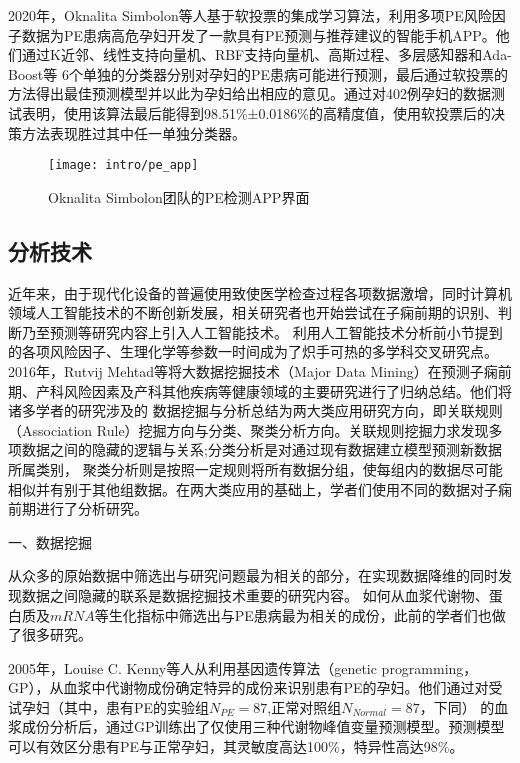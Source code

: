 2020年，Oknalita Simbolon等人基于软投票的集成学习算法，利用多项PE风险因子数据为PE患病高危孕妇开发了一款具有PE预测与推荐建议的智能手机APP\cite{Simbolon2020}。他们通过K近邻、线性支持向量机、RBF支持向量机、高斯过程、多层感知器和Ada-Boost等
6个单独的分类器分别对孕妇的PE患病可能进行预测，最后通过软投票的方法得出最佳预测模型并以此为孕妇给出相应的意见。通过对402例孕妇的数据测试表明，使用该算法最后能得到98.51\%±0.0186\%的高精度值，使用软投票后的决策方法表现胜过其中任一单独分类器。
\begin{figure}[htbp]
    \centering
    \texttt{[image: intro/pe\_app]}
    \caption[Oknalita Simbolon团队的PE检测APP界面]{\label{fig:pe_app}Oknalita Simbolon团队的PE检测APP界面\cite{Simbolon2020}}
\end{figure}

\subsection{分析技术}
近年来，由于现代化设备的普遍使用致使医学检查过程各项数据激增，同时计算机领域人工智能技术的不断创新发展，相关研究者也开始尝试在子痫前期的识别、判断乃至预测等研究内容上引入人工智能技术。
利用人工智能技术分析前小节提到的各项风险因子、生理化学等参数一时间成为了炽手可热的多学科交叉研究点。
2016年，Rutvij Mehtad等\cite{Mehta2016}将大数据挖掘技术（Major Data Mining）在预测子痫前期、产科风险因素及产科其他疾病等健康领域的主要研究进行了归纳总结。他们将诸多学者的研究涉及的
数据挖掘与分析总结为两大类应用研究方向，即关联规则（Association Rule）挖掘方向与分类、聚类分析方向。关联规则挖掘力求发现多项数据之间的隐藏的逻辑与关系;分类分析是对通过现有数据建立模型预测新数据所属类别，
聚类分析则是按照一定规则将所有数据分组，使每组内的数据尽可能相似并有别于其他组数据\cite{Han2006}。在两大类应用的基础上，学者们使用不同的数据对子痫前期进行了分析研究。

一、数据挖掘

从众多的原始数据中筛选出与研究问题最为相关的部分，在实现数据降维的同时发现数据之间隐藏的联系是数据挖掘技术重要的研究内容。
如何从血浆代谢物、蛋白质及$mRNA$等生化指标中筛选出与PE患病最为相关的成份，此前的学者们也做了很多研究。

2005年，Louise C. Kenny等人\cite{Kenny2005}从利用基因遗传算法（genetic programming，GP），从血浆中代谢物成份确定特异的成份来识别患有PE的孕妇。他们通过对受试孕妇（其中，患有PE的实验组$N_{PE}=87$,正常对照组$N_{Normal}=87$，下同）
的血浆成份分析后，通过GP训练出了仅使用三种代谢物峰值变量预测模型。预测模型可以有效区分患有PE与正常孕妇，其灵敏度高达100\%，特异性高达98\%。


